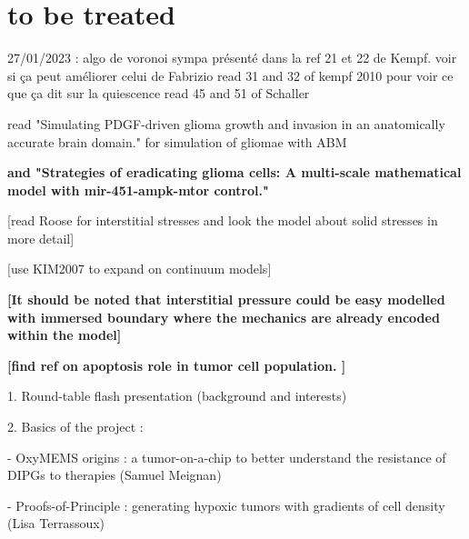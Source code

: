 \documentclass[11pt,a4paper]{article}
\begin{document}





\section*{to be treated}

27/01/2023 : algo de voronoi sympa présenté dans la ref 21 et 22 de Kempf. voir si ça peut améliorer celui de Fabrizio
	read 31 and 32 of kempf 2010 pour voir ce que ça dit sur la quiescence
	read 45  and 51 of Schaller

read "Simulating PDGF-driven glioma growth and invasion in an anatomically accurate brain domain." for simulation of gliomae with ABM

\textbf{and "Strategies of eradicating glioma cells: A multi-scale mathematical model with mir-451-ampk-mtor control."}

[read Roose for interstitial stresses and look the model about solid stresses in more detail]

[use KIM2007 to expand on continuum models]

\textbf{[It should be noted that interstitial pressure could be easy modelled with immersed boundary where the mechanics are already encoded within the model]}


\textbf{[find ref on apoptosis role in tumor cell population. ]}





1.      Round-table flash presentation (background and interests)

2.      Basics of the project :

-        OxyMEMS origins : a tumor-on-a-chip to better understand the resistance of DIPGs to therapies (Samuel Meignan) 

-        Proofs-of-Principle : generating hypoxic tumors with gradients of cell density (Lisa Terrassoux) 
\end{document}
